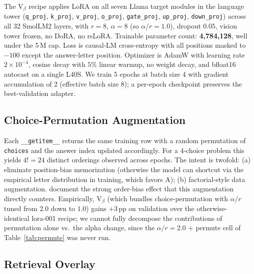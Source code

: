 \documentclass[11pt]{article}
\begin{document}
\label{sec:lora}
The V$_\beta$ recipe applies LoRA \citep{hu2022lora} on all seven Llama target modules in the language tower (\texttt{q\_proj}, \texttt{k\_proj}, \texttt{v\_proj}, \texttt{o\_proj}, \texttt{gate\_proj}, \texttt{up\_proj}, \texttt{down\_proj}) across all 32 SmolLM2 layers, with $r=8$, $\alpha=8$ (so $\alpha/r=1.0$), dropout $0.05$, vision tower frozen, no DoRA, no rsLoRA. Trainable parameter count: \textbf{4{,}784{,}128}, well under the 5\,M cap. Loss is causal-LM cross-entropy with all positions masked to $-100$ except the answer-letter position. Optimizer is AdamW \citep{loshchilov2019adamw} with learning rate $2 \times 10^{-4}$, cosine decay with $5\%$ linear warmup, no weight decay, and bfloat16 autocast on a single L40S. We train 5 epochs at batch size 4 with gradient accumulation of 2 (effective batch size 8); a per-epoch checkpoint preserves the best-validation adapter.

\subsection{Choice-Permutation Augmentation}

\label{sec:permute}
Each \texttt{\_\_getitem\_\_} returns the same training row with a random permutation of \texttt{choices} and the answer index updated accordingly. For a 4-choice problem this yields $4! = 24$ distinct orderings observed across epochs. The intent is twofold: (a) eliminate position-bias memorization (otherwise the model can shortcut via the empirical letter distribution in training, which favors A); (b) factorial-style data augmentation. \citet{pezeshkpour2023sensitivity} document the strong order-bias effect that this augmentation directly counters. Empirically, V$_\beta$ (which bundles choice-permutation with $\alpha/r$ tuned from $2.0$ down to $1.0$) gains $+3$\,pp on validation over the otherwise-identical lora-001 recipe; we cannot fully decompose the contributions of permutation alone vs.\ the alpha change, since the $\alpha/r=2.0$ + permute cell of Table~\ref{tab:permute} was never run.

\subsection{Retrieval Overlay}
\end{document}

